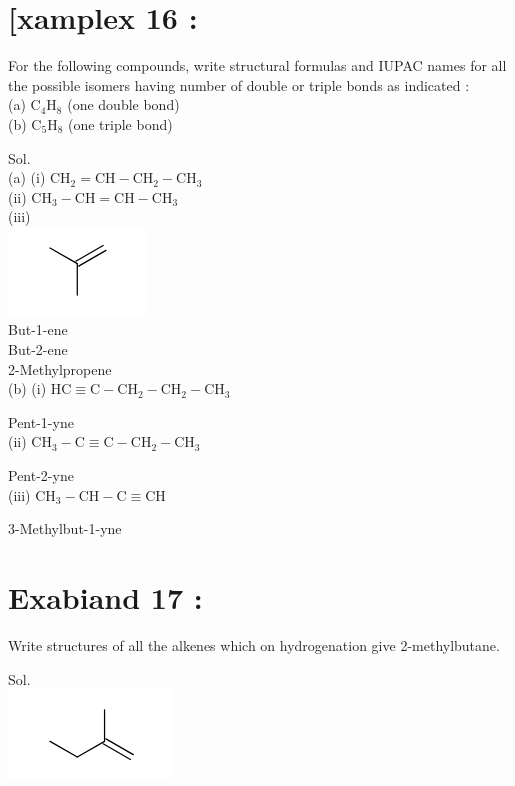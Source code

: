 \documentclass[10pt]{article}
\begin{document}
\section*{[xamplex 16 :}
For the following compounds, write structural formulas and IUPAC names for all the possible isomers having number of double or triple bonds as indicated :\\
(a) $\mathrm{C}_{4} \mathrm{H}_{8}$ (one double bond)\\
(b) $\mathrm{C}_{5} \mathrm{H}_{8}$ (one triple bond)

Sol.\\
(a) (i) $\mathrm{CH}_{2}=\mathrm{CH}-\mathrm{CH}_{2}-\mathrm{CH}_{3}$\\
(ii) $\mathrm{CH}_{3}-\mathrm{CH}=\mathrm{CH}-\mathrm{CH}_{3}$\\
(iii)\\
\includegraphics{smile-fac7f5bc9db69dc2e2f293ad20ac287385828824}\\
But-1-ene\\
But-2-ene\\
2-Methylpropene\\
(b) (i) $\mathrm{HC} \equiv \mathrm{C}-\mathrm{CH}_{2}-\mathrm{CH}_{2}-\mathrm{CH}_{3}$

Pent-1-yne\\
(ii) $\mathrm{CH}_{3}-\mathrm{C} \equiv \mathrm{C}-\mathrm{CH}_{2}-\mathrm{CH}_{3}$

Pent-2-yne\\
(iii) $\mathrm{CH}_{3}-\mathrm{CH}-\mathrm{C} \equiv \mathrm{CH}$

3-Methylbut-1-yne

\section*{Exabiand 17 :}
Write structures of all the alkenes which on hydrogenation give 2-methylbutane.

Sol.\\
\includegraphics{smile-29469d817b13032311fbf1f92c994e226c2533bf}
\end{document}
